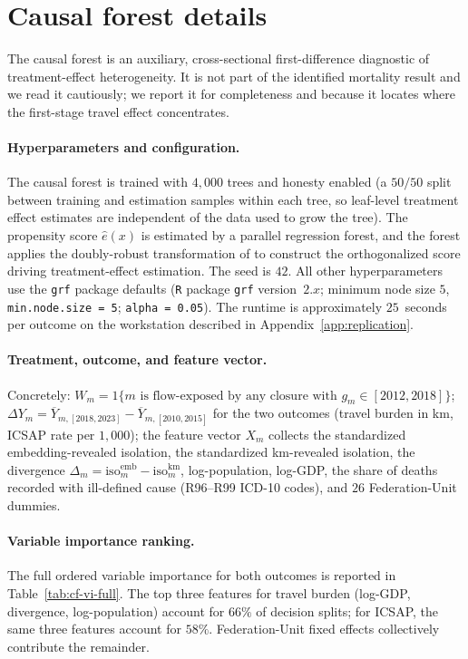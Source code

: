 \section{Causal forest details}
\label{app:cf}

The causal forest is an auxiliary, cross-sectional first-difference
diagnostic of treatment-effect heterogeneity. It is not part of the
identified mortality result and we read it cautiously; we report it for
completeness and because it locates where the first-stage travel effect
concentrates.

\paragraph{Hyperparameters and configuration.} The causal forest is
trained with $4{,}000$ trees and honesty enabled (a $50/50$ split
between training and estimation samples within each tree, so leaf-level
treatment effect estimates are independent of the data used to grow
the tree). The propensity score $\widehat{e}(x)$ is estimated by a
parallel regression forest, and the forest applies the doubly-robust
transformation of \citet{wagerAthey2018} to construct the
orthogonalized score driving treatment-effect estimation. The seed is
$42$. All other hyperparameters use the \texttt{grf} package defaults
(\texttt{R} package \texttt{grf} version~$2.x$; minimum node size $5$,
\texttt{min.node.size = 5}; \texttt{alpha = 0.05}). The runtime is
approximately $25$~seconds per outcome on the workstation described in
Appendix~\ref{app:replication}.

\paragraph{Treatment, outcome, and feature vector.} Concretely:
$W_m = 1\{m \text{ is flow-exposed by any
closure with } g_m \in [2012, 2018]\}$; $\Delta Y_m = \overline{Y}_{m,
[2018, 2023]} - \overline{Y}_{m, [2010, 2015]}$ for the two outcomes
(travel burden in km, ICSAP rate per $1{,}000$); the feature vector
$X_m$ collects the standardized embedding-revealed isolation, the
standardized km-revealed isolation, the divergence
$\Delta_m = \mathrm{iso}^{\mathrm{emb}}_m -
\mathrm{iso}^{\mathrm{km}}_m$, log-population, log-GDP, the share of
deaths recorded with ill-defined cause (R96--R99 ICD-10 codes), and
$26$ Federation-Unit dummies.

\paragraph{Variable importance ranking.} The full ordered variable
importance for both outcomes is reported in
Table~\ref{tab:cf-vi-full}. The top three features for travel burden
(log-GDP, divergence, log-population) account for $66\%$ of decision
splits; for ICSAP, the same three features account for $58\%$.
Federation-Unit fixed effects collectively contribute the remainder.

